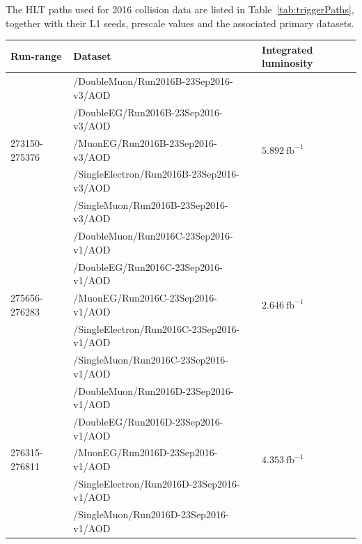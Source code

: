 The HLT paths used for 2016 collision data are listed in Table~\ref{tab:triggerPaths}, 
together with their L1 seeds, prescale values and the associated primary datasets.


\begin{table}[h]
\tiny
    \centering
    \begin{tabular}{l|l|l} 
\hline %
Run-range & Dataset & Integrated luminosity \\
\hline %
\multirow{5}{*}{273150-275376} & /DoubleMuon/Run2016B-23Sep2016-v3/AOD &  \multirow{5}{*}{$5.892\ \text{fb}^{-1}$} \\ 
& /DoubleEG/Run2016B-23Sep2016-v3/AOD &  \\ 
& /MuonEG/Run2016B-23Sep2016-v3/AOD &  \\ 
& /SingleElectron/Run2016B-23Sep2016-v3/AOD &  \\ 
& /SingleMuon/Run2016B-23Sep2016-v3/AOD &  \\ 
\hline
\multirow{5}{*}{275656-276283} & /DoubleMuon/Run2016C-23Sep2016-v1/AOD &  \multirow{5}{*}{$2.646\ \text{fb}^{-1}$}  \\ 
& /DoubleEG/Run2016C-23Sep2016-v1/AOD &  \\ 
& /MuonEG/Run2016C-23Sep2016-v1/AOD &  \\ 
& /SingleElectron/Run2016C-23Sep2016-v1/AOD &  \\ 
& /SingleMuon/Run2016C-23Sep2016-v1/AOD &  \\ 
\hline
\multirow{5}{*}{276315-276811} & /DoubleMuon/Run2016D-23Sep2016-v1/AOD &  \multirow{5}{*}{$4.353\ \text{fb}^{-1}$} \\ 
& /DoubleEG/Run2016D-23Sep2016-v1/AOD &  \\ 
& /MuonEG/Run2016D-23Sep2016-v1/AOD &  \\ 
& /SingleElectron/Run2016D-23Sep2016-v1/AOD &  \\ 
& /SingleMuon/Run2016D-23Sep2016-v1/AOD &  \\ 

\end{tabular}
\end{table}
